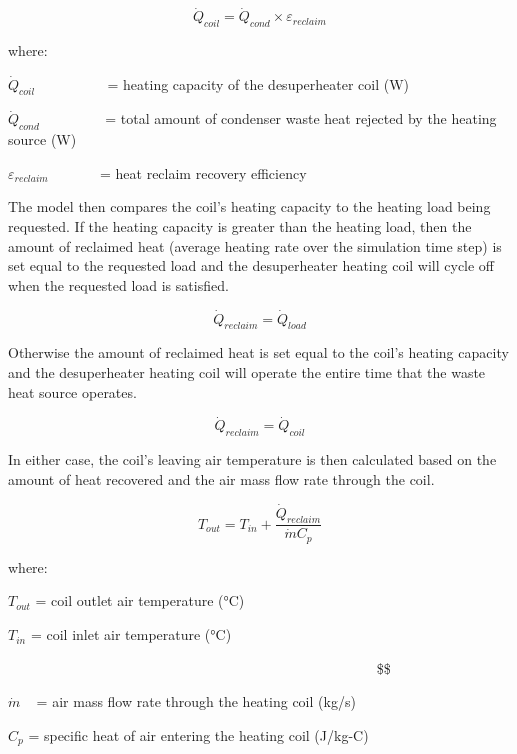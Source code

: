\begin{equation}
{\dot Q_{coil}} = {\dot Q_{cond}} \times {\varepsilon_{reclaim}}
\end{equation}

where:

\({\dot Q_{coil}}\) ~~~~~~~~~ = heating capacity of the desuperheater coil (W)

\({\dot Q_{cond}}\) ~~~~~~~~ = total amount of condenser waste heat rejected by the heating source (W)

\({\varepsilon_{reclaim}}\) ~~~~~~ = heat reclaim recovery efficiency

The model then compares the coil's heating capacity to the heating load being requested. If the heating capacity is greater than the heating load, then the amount of reclaimed heat (average heating rate over the simulation time step) is set equal to the requested load and the desuperheater heating coil will cycle off when the requested load is satisfied.

\begin{equation}
{\dot Q_{reclaim}} = {\dot Q_{load}}
\end{equation}

Otherwise the amount of reclaimed heat is set equal to the coil's heating capacity and the desuperheater heating coil will operate the entire time that the waste heat source operates.

\begin{equation}
{\dot Q_{reclaim}} = {\dot Q_{coil}}
\end{equation}

In either case, the coil's leaving air temperature is then calculated based on the amount of heat recovered and the air mass flow rate through the coil.

\begin{equation}
{T_{out}} = {T_{in}} + \frac{{{{\dot Q}_{reclaim}}}}{{\dot m{C_p}}}
\end{equation}

where:

\({T_{out}}\) = coil outlet air temperature (°C)

\({T_{in}}\) = coil inlet air temperature (°C)

~~~~~~~~~~~~~~~~~~~~~~~~~~~~~~~~~~~~~~~~~~~~~~~~~~~~ \$\$

\(\dot m\) ~ = air mass flow rate through the heating coil (kg/s)

\({C_p}\) = specific heat of air entering the heating coil (J/kg-C)

